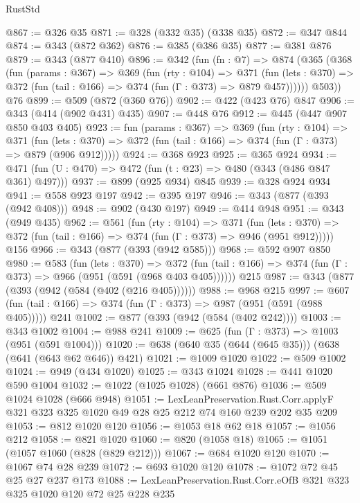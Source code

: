 \begin{lexlean}{RustStd}
\begin{coremodule}
@867 := @326 @35
@871 := @328 (@332 @35) (@338 @35)
@872 := @347 @844
@874 := @343 (@872 @362)
@876 := @385 (@386 @35)
@877 := @381 @876
@879 := @343 (@877 @410)
@896 := @342
    (fun (fn : @7) =>
    @874
      (@365
        (@368
          (fun (params : @367) =>
          @369
            (fun (rty : @104) =>
            @371
              (fun (lets : @370) =>
              @372 (fun (tail : @166) => @374 (fun (Γ : @373) => @879 @457))))))
        @503))
    @76
@899 := @509 (@872 (@360 @76))
@902 := @422 (@423 @76) @847
@906 := @343 (@414 (@902 @431) @435)
@907 := @448 @76
@912 := @445 (@447 @907 @850 @403 @405)
@923 := fun (params : @367) =>
  @369
    (fun (rty : @104) =>
    @371
      (fun (lets : @370) => @372 (fun (tail : @166) => @374 (fun (Γ : @373) => @879 (@906 @912)))))
@924 := @368 @923
@925 := @365 @924
@934 := @471 (fun (U : @470) => @472 (fun (t : @23) => @480 (@343 (@486 @847 @361) @497)))
@937 := @899 (@925 @934) @845
@939 := @328 @924 @934
@941 := @558 @923 @197
@942 := @395 @197
@946 := @343 (@877 (@393 (@942 @408)))
@948 := @902 (@430 @197)
@949 := @414 @948
@951 := @343 (@949 @435)
@962 := @561
    (fun (rty : @104) =>
    @371
      (fun (lets : @370) => @372 (fun (tail : @166) => @374 (fun (Γ : @373) => @946 (@951 @912)))))
    @156
@966 := @343 (@877 (@393 (@942 @585)))
@968 := @592 @907 @850
@980 := @583
    (fun (lets : @370) =>
    @372 (fun (tail : @166) => @374 (fun (Γ : @373) => @966 (@951 (@591 (@968 @403 @405))))))
    @215
@987 := @343 (@877 (@393 (@942 (@584 (@402 (@216 @405))))))
@988 := @968 @215
@997 := @607 (fun (tail : @166) => @374 (fun (Γ : @373) => @987 (@951 (@591 (@988 @405))))) @241
@1002 := @877 (@393 (@942 (@584 (@402 @242))))
@1003 := @343 @1002
@1004 := @988 @241
@1009 := @625 (fun (Γ : @373) => @1003 (@951 (@591 @1004)))
@1020 := @638 (@640 @35 (@644 (@645 @35))) (@638 (@641 (@643 @62 @646)) @421)
@1021 := @1009 @1020
@1022 := @509 @1002
@1024 := @949 (@434 @1020)
@1025 := @343 @1024
@1028 := @441 @1020 @590 @1004
@1032 := @1022 (@1025 @1028) (@661 @876)
@1036 := @509 @1024 @1028 (@666 @948)
@1051 := LexLeanPreservation.Rust.Corr.applyF
    @321
    @323
    @325
    @1020
    @49
    @28
    @25
    @212
    @74
    @160
    @239
    @202
    @35
    @209
@1053 := @812 @1020 @120
@1056 := @1053 @18 @62 @18
@1057 := @1056 @212
@1058 := @821 @1020
@1060 := @820 (@1058 @18)
@1065 := @1051 (@1057 @1060 (@828 (@829 @212)))
@1067 := @684 @1020 @120
@1070 := @1067 @74 @28 @239
@1072 := @693 @1020 @120
@1078 := @1072 @72 @45 @25 @27 @237 @173
@1088 := LexLeanPreservation.Rust.Corr.eOfB @321 @323 @325 @1020 @120 @72 @25 @228 @235

\end{coremodule}
\end{lexlean}
